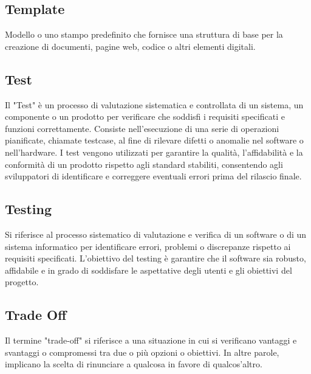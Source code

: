 \documentclass{article}
\begin{document}
\subsection{Template}
Modello o uno stampo predefinito che fornisce una struttura di base per la creazione di documenti, pagine web, codice o altri elementi digitali.

\subsection{Test}
Il "Test" è un processo di valutazione sistematica e controllata di un sistema, un componente o un prodotto per verificare che soddisfi i requisiti specificati e funzioni correttamente. Consiste nell'esecuzione di una serie di operazioni pianificate, chiamate testcase, al fine di rilevare difetti o anomalie nel software o nell'hardware. I test vengono utilizzati per garantire la qualità, l'affidabilità e la conformità di un prodotto rispetto agli standard stabiliti, consentendo agli sviluppatori di identificare e correggere eventuali errori prima del rilascio finale.

\subsection{Testing}
Si riferisce al processo sistematico di valutazione e verifica di un software o di un sistema informatico per identificare errori, problemi o discrepanze rispetto ai requisiti specificati. L'obiettivo del testing è garantire che il software sia robusto, affidabile e in grado di soddisfare le aspettative degli utenti e gli obiettivi del progetto.

\subsection{Trade Off}
Il termine "trade-off" si riferisce a una situazione in cui si verificano vantaggi e svantaggi o compromessi tra due o più opzioni o obiettivi. In altre parole, implicano la scelta di rinunciare a qualcosa in favore di qualcos'altro.
\end{document}

